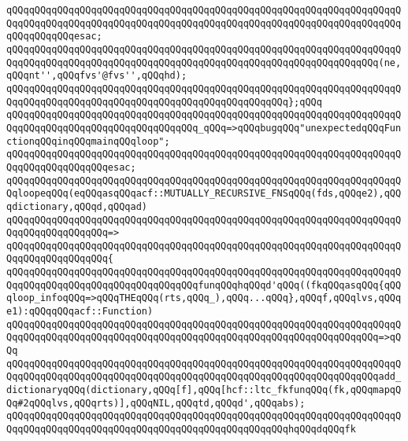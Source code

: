 \verb|qQQqqQQqqQQqqQQqqQQqqQQqqQQqqQQqqQQqqQQqqQQqqQQqqQQqqQQqqQQqqQQqqQQqqQQqqQQqqQQqqQQqqQQqqQQqqQQqqQQqqQQqqQQqqQQqqQQqqQQqqQQqqQQqqQQqqQQqqQQqqQQqqQQqqQQqesac;|\newline
\newline
\verb|qQQqqQQqqQQqqQQqqQQqqQQqqQQqqQQqqQQqqQQqqQQqqQQqqQQqqQQqqQQqqQQqqQQqqQQqqQQqqQQqqQQqqQQqqQQqqQQqqQQqqQQqqQQqqQQqqQQqqQQqqQQqqQQqqQQqqQQq(ne,qQQqnt'',qQQqfvs'@fvs'',qQQqhd);|\newline
\verb|qQQqqQQqqQQqqQQqqQQqqQQqqQQqqQQqqQQqqQQqqQQqqQQqqQQqqQQqqQQqqQQqqQQqqQQqqQQqqQQqqQQqqQQqqQQqqQQqqQQqqQQqqQQqqQQqqQQqqQQq};qQQq|\newline
\newline
\verb|qQQqqQQqqQQqqQQqqQQqqQQqqQQqqQQqqQQqqQQqqQQqqQQqqQQqqQQqqQQqqQQqqQQqqQQqqQQqqQQqqQQqqQQqqQQqqQQqqQQqqQQq_qQQq=>qQQqbugqQQq"unexpectedqQQqFunctionqQQqinqQQqmainqQQqloop";|\newline
\verb|qQQqqQQqqQQqqQQqqQQqqQQqqQQqqQQqqQQqqQQqqQQqqQQqqQQqqQQqqQQqqQQqqQQqqQQqqQQqqQQqqQQqqQQqesac;|\newline
\newline
\verb|qQQqqQQqqQQqqQQqqQQqqQQqqQQqqQQqqQQqqQQqqQQqqQQqqQQqqQQqqQQqqQQqqQQqqQQqloopeqQQq(eqQQqasqQQqacf::MUTUALLY_RECURSIVE_FNSqQQq(fds,qQQqe2),qQQqdictionary,qQQqd,qQQqad)|\newline
\verb|qQQqqQQqqQQqqQQqqQQqqQQqqQQqqQQqqQQqqQQqqQQqqQQqqQQqqQQqqQQqqQQqqQQqqQQqqQQqqQQqqQQqqQQq=>|\newline
\verb|qQQqqQQqqQQqqQQqqQQqqQQqqQQqqQQqqQQqqQQqqQQqqQQqqQQqqQQqqQQqqQQqqQQqqQQqqQQqqQQqqQQqqQQq{|\newline
\verb|qQQqqQQqqQQqqQQqqQQqqQQqqQQqqQQqqQQqqQQqqQQqqQQqqQQqqQQqqQQqqQQqqQQqqQQqqQQqqQQqqQQqqQQqqQQqqQQqqQQqqQQqfunqQQqhqQQqd'qQQq((fkqQQqasqQQq{qQQqloop_infoqQQq=>qQQqTHEqQQq(rts,qQQq_),qQQq...qQQq},qQQqf,qQQqlvs,qQQqe1):qQQqqQQqacf::Function)|\newline
\verb|qQQqqQQqqQQqqQQqqQQqqQQqqQQqqQQqqQQqqQQqqQQqqQQqqQQqqQQqqQQqqQQqqQQqqQQqqQQqqQQqqQQqqQQqqQQqqQQqqQQqqQQqqQQqqQQqqQQqqQQqqQQqqQQqqQQqqQQq=>qQQq|\newline
\verb|qQQqqQQqqQQqqQQqqQQqqQQqqQQqqQQqqQQqqQQqqQQqqQQqqQQqqQQqqQQqqQQqqQQqqQQqqQQqqQQqqQQqqQQqqQQqqQQqqQQqqQQqqQQqqQQqqQQqqQQqqQQqqQQqqQQqqQQqadd_dictionaryqQQq(dictionary,qQQq[f],qQQq[hcf::ltc_fkfunqQQq(fk,qQQqmapqQQq#2qQQqlvs,qQQqrts)],qQQqNIL,qQQqtd,qQQqd',qQQqabs);|\newline
\newline
\verb|qQQqqQQqqQQqqQQqqQQqqQQqqQQqqQQqqQQqqQQqqQQqqQQqqQQqqQQqqQQqqQQqqQQqqQQqqQQqqQQqqQQqqQQqqQQqqQQqqQQqqQQqqQQqqQQqqQQqqQQqhqQQqdqQQqfk|\newline
